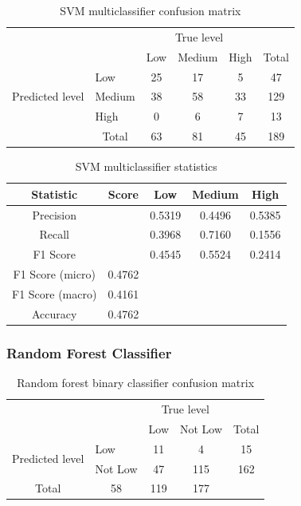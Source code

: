 \documentclass[12pt, a4paper]{article}
\begin{document}
\begin{table}[ht]
\centering
\begin{tabular}{l|l|c|c|c|c}
\multicolumn{2}{c}{}&\multicolumn{3}{c}{True level}&\\
\cline{3-5}
\multicolumn{2}{c|}{}&Low&Medium&High&\multicolumn{1}{c}{Total}\\
\cline{2-5}
\multirow{3}{*}{Predicted level}& Low & 25 & 17 & 5 & 47\\
\cline{2-5}
& Medium & 38 & 58 & 33 & 129\\
\cline{2-5}
& High & 0 & 6 & 7 & 13\\
\cline{2-5}
\multicolumn{1}{c}{} & \multicolumn{1}{c}{Total} & \multicolumn{1}{c}{63} & \multicolumn{    1}{c}{81} & \multicolumn{    1}{c}{45} & \multicolumn{1}{c}{189}\\
\end{tabular}

\caption{SVM multiclassifier confusion matrix}
\label{table:svmcm}
\end{table}

\begin{table}[ht]
\centering
\begin{tabular}{||c c c c c||} 
 \hline
 Statistic & Score & Low & Medium & High  \\ [0.5ex] 
 \hline\hline
 Precision &  & 0.5319 & 0.4496 & 0.5385 \\ 
 Recall & & 0.3968 & 0.7160  & 0.1556 \\
 F1 Score &  & 0.4545 & 0.5524  & 0.2414\\
 F1 Score (micro) & 0.4762 & & & \\
 F1 Score (macro)  & 0.4161 & & & \\ 
 Accuracy  & 0.4762 & & & \\ [1ex] 
 \hline
\end{tabular}

\caption{SVM multiclassifier statistics}
\label{table:svmstat}
\end{table}

\subsubsection{Random Forest Classifier}

\begin{table}[ht]
\centering
\begin{tabular}{l|l|c|c|c}
\multicolumn{2}{c}{}&\multicolumn{2}{c}{True level}&\\
\cline{3-4}
\multicolumn{2}{c|}{}&Low&Not Low&\multicolumn{1}{c}{Total}\\
\cline{2-4}
\multirow{2}{*}{Predicted level}& Low & 11 & 4 & 15\\
\cline{2-4}
& Not Low & 47 & 115 & 162\\
\cline{2-4}
\multicolumn{1}{c}{Total} & \multicolumn{1}{c}{58} & \multicolumn{    1}{c}{119} & \multicolumn{1}{c}{177}\\
\end{tabular}
\caption{Random forest binary classifier confusion matrix}
\label{table:rfcm_low}
\end{table}
\end{document}
